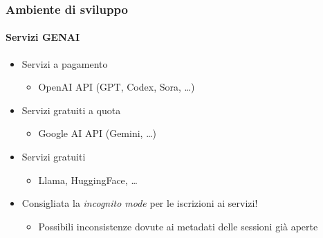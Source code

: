 \begin{frame}[t,fragile] \frametitle{Ambiente di sviluppo}
\framesubtitle{Servizi GENAI}
    \begin{itemize}
        \item[\alertedcircled{1}] Servizi a pagamento
        \begin{itemize}[leftmargin=20pt,align=right]
			\item[\alert{\faArrowCircleRight}] OpenAI API (GPT, Codex, Sora, \ldots)
        \end{itemize}
        \item[\alertedcircled{2}] Servizi gratuiti a quota
        \begin{itemize}[leftmargin=20pt,align=right]
			\item[\alert{\faArrowCircleRight}] Google AI API (Gemini, \ldots)
        \end{itemize}
        \item[\alertedcircled{3}] Servizi gratuiti
        \begin{itemize}[leftmargin=20pt,align=right]
			\item[\alert{\faArrowCircleRight}] Llama, HuggingFace, \ldots
        \end{itemize}        
    \end{itemize}
    \vfill
    \begin{itemize}
        \item[\alert{\faExclamationTriangle}] Consigliata la \textit{incognito mode} per le iscrizioni ai servizi!
        \begin{itemize}[leftmargin=20pt,align=right]
			\item[\alert{\faArrowCircleRight}] Possibili inconsistenze dovute ai metadati delle sessioni già aperte
        \end{itemize} 
    \end{itemize}
\end{frame}
%
